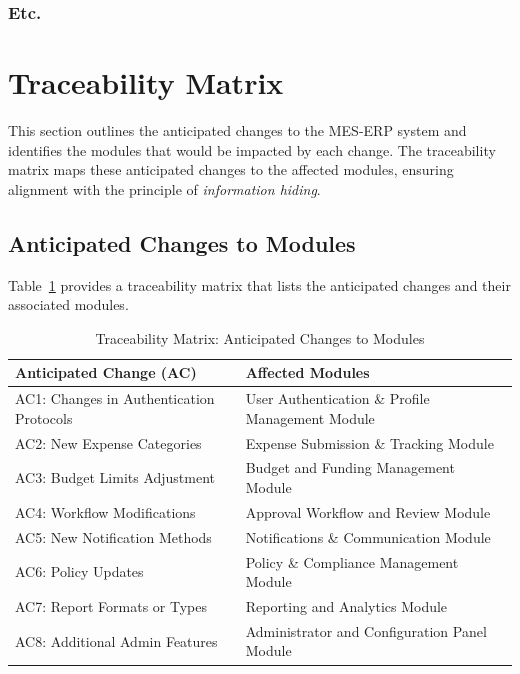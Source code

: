 \documentclass[12pt, titlepage]{article}
\begin{document}
\subsubsection{Etc.}

\section{Traceability Matrix}

This section outlines the anticipated changes to the MES-ERP system and identifies the modules that would be impacted by each change. The traceability matrix maps these anticipated changes to the affected modules, ensuring alignment with the principle of \textit{information hiding}.

\subsection{Anticipated Changes to Modules}

Table~\ref{tab:anticipated-changes} provides a traceability matrix that lists the anticipated changes and their associated modules.

\begin{table}[h!]
\centering
\caption{Traceability Matrix: Anticipated Changes to Modules}
\label{tab:anticipated-changes}
\begin{tabular}{|p{6cm}|p{8cm}|}
\hline
\textbf{Anticipated Change (AC)} & \textbf{Affected Modules} \\
\hline
AC1: Changes in Authentication Protocols & User Authentication \& Profile Management Module \\
\hline
AC2: New Expense Categories & Expense Submission \& Tracking Module \\
\hline
AC3: Budget Limits Adjustment & Budget and Funding Management Module \\
\hline
AC4: Workflow Modifications & Approval Workflow and Review Module \\
\hline
AC5: New Notification Methods & Notifications \& Communication Module \\
\hline
AC6: Policy Updates & Policy \& Compliance Management Module \\
\hline
AC7: Report Formats or Types & Reporting and Analytics Module \\
\hline
AC8: Additional Admin Features & Administrator and Configuration Panel Module \\
\hline
\end{tabular}
\end{table}
\end{document}
